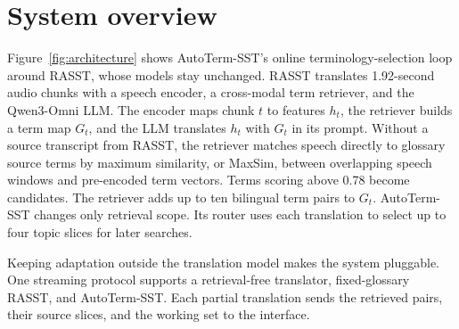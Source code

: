 \section{System overview}
\label{sec:system}

Figure~\ref{fig:architecture} shows AutoTerm-SST's online terminology-selection
loop around RASST, whose models stay unchanged. RASST translates 1.92-second
audio chunks with a speech encoder, a cross-modal term retriever, and the
Qwen3-Omni LLM. The encoder maps chunk $t$ to features $h_t$, the retriever
builds a term map $G_t$, and the LLM translates $h_t$ with $G_t$ in its prompt.
Without a source transcript from RASST, the retriever matches speech directly
to glossary source terms by maximum similarity, or MaxSim, between overlapping
speech windows and pre-encoded term vectors. Terms scoring above 0.78 become
candidates. The retriever adds up to ten bilingual term pairs to $G_t$.
AutoTerm-SST changes only retrieval scope. Its router uses each translation
to select up to four topic slices for later searches.

Keeping adaptation outside the translation model makes the system pluggable.
One streaming protocol supports a retrieval-free translator, fixed-glossary
RASST, and AutoTerm-SST. Each partial translation sends the retrieved pairs,
their source slices, and the working set to the interface.
